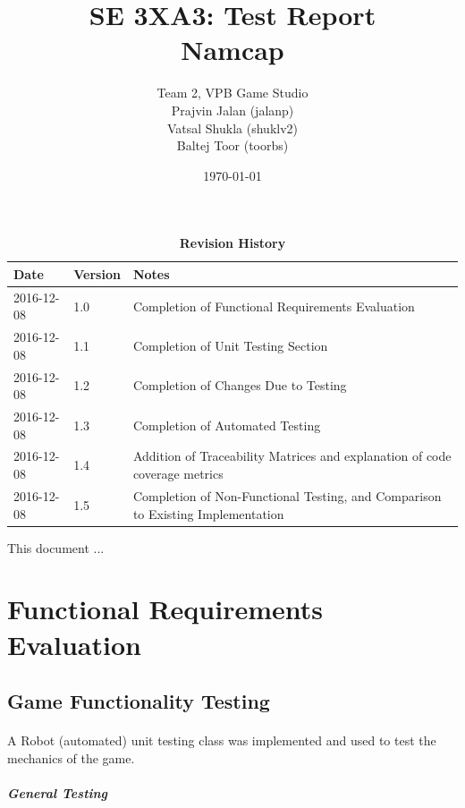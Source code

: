 \documentclass[12pt, titlepage]{article}
\title{SE 3XA3: Test Report\\Namcap}
\author{Team 2, VPB Game Studio
		\\ Prajvin Jalan (jalanp)
		\\ Vatsal Shukla (shuklv2)
		\\ Baltej Toor (toorbs)
}
\date{\today}
\begin{document}
\maketitle

\tableofcontents
\listoftables
\listoffigures

\begin{table}[h]
\caption{\bf Revision History}
\begin{tabularx}{\textwidth}{p{3cm}p{2cm}X}
\toprule {\bf Date} & {\bf Version} & {\bf Notes}\\
\midrule
2016-12-08 & 1.0 & Completion of Functional Requirements Evaluation\\
2016-12-08 & 1.1 & Completion of Unit Testing Section\\
2016-12-08 & 1.2 & Completion of Changes Due to Testing\\
2016-12-08 & 1.3 & Completion of Automated Testing\\
2016-12-08 & 1.4 & Addition of Traceability Matrices and explanation of code coverage metrics\\
2016-12-08 & 1.5 & Completion of Non-Functional Testing, and Comparison to Existing Implementation\\
\bottomrule
\end{tabularx}
\end{table}

\newpage


This document ...

\section{Functional Requirements Evaluation}

\subsection{Game Functionality Testing}

\paragraph{}
A Robot (automated) unit testing class was implemented and used to test the mechanics of the game.

\subparagraph{General Testing}
\end{document}
